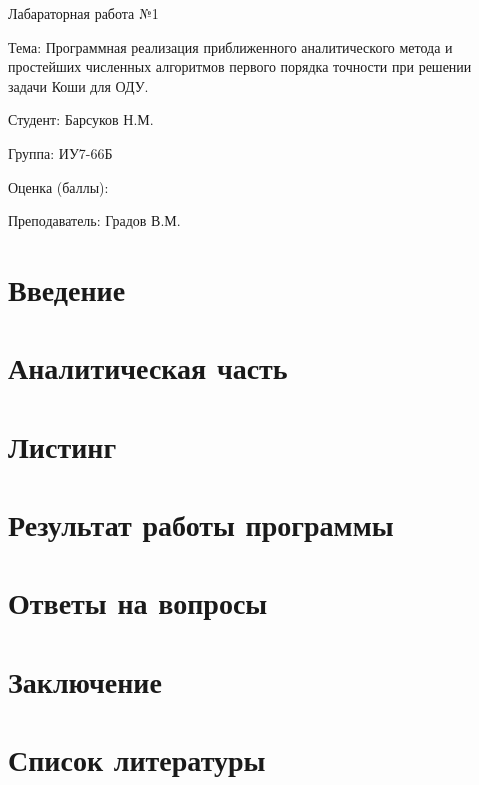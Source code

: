 \documentclass[a4paper, 14pt]{article}
\begin{document}
	\begin{titlepage}
		\begin{center}
			\begin{LARGE}
				Лабараторная работа №1
			\end{LARGE}
			
			\begin{Large}
				\vspace{5cm}
				Тема: Программная реализация приближенного аналитического метода и простейших численных алгоритмов  первого порядка точности при решении  задачи Коши для ОДУ.
				
				\vspace{5cm}
				Студент: Барсуков Н.М.
				
				Группа: ИУ7-66Б
				
				Оценка (баллы):
				
				Преподаватель: Градов В.М.
			\end{Large}
		\end{center}
	\end{titlepage}

	\newpage
	\tableofcontents
	
	\newpage
	\section*{Введение}
	
	\newpage
	\section{Аналитическая часть}
	
	\newpage
	\section{Листинг}
	
	\newpage
	\section{Результат работы программы}
	
	\newpage
	\section{Ответы на вопросы}
	
	\newpage
	\section{Заключение}
	
	\newpage
	\section{Список литературы}
	
\end{document}
